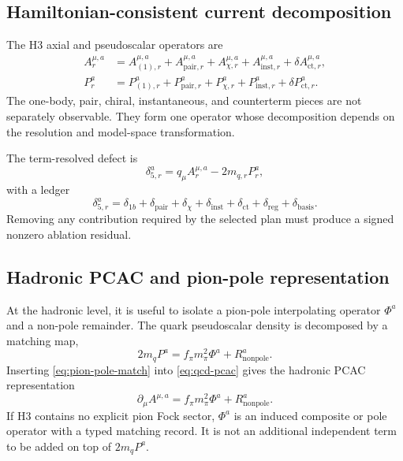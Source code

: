 \documentclass[11pt]{article}
\newcommand{\ct}{\mathrm{ct}}
\newcommand{\reg}{\mathrm{reg}}
\begin{document}
\subsection{Hamiltonian-consistent current decomposition}

The H3 axial and pseudoscalar operators are
\begin{align}
 A_{r}^{\mu,a}
 &={}
 A_{(1),r}^{\mu,a}
 +A_{\mathrm{pair},r}^{\mu,a}
 +A_{\chi,r}^{\mu,a}
 +A_{\mathrm{inst},r}^{\mu,a}
 +\delta A_{\ct,r}^{\mu,a},
 \\
 P_{r}^{a}
 &={}
 P_{(1),r}^{a}
 +P_{\mathrm{pair},r}^{a}
 +P_{\chi,r}^{a}
 +P_{\mathrm{inst},r}^{a}
 +\delta P_{\ct,r}^{a}.
 \label{eq:h3-axial-decomp}
\end{align}
The one-body, pair, chiral, instantaneous, and counterterm pieces are not
separately observable.  They form one operator whose decomposition depends on
the resolution and model-space transformation.

The term-resolved defect is
\begin{equation}
 \delta_{5,r}^{a}
 =
 q_{\mu}A_{r}^{\mu,a}
 -2m_{q,r}P_{r}^{a},
 \label{eq:axial-defect}
\end{equation}
with a ledger
\begin{equation}
 \delta_{5,r}^{a}
 =
 \delta_{1b}
 +\delta_{\mathrm{pair}}
 +\delta_{\chi}
 +\delta_{\mathrm{inst}}
 +\delta_{\ct}
 +\delta_{\reg}
 +\delta_{\mathrm{basis}}.
\end{equation}
Removing any contribution required by the selected plan must produce a signed
nonzero ablation residual.

\subsection{Hadronic PCAC and pion-pole representation}

At the hadronic level, it is useful to isolate a pion-pole interpolating
operator \(\Phi^a\) and a non-pole remainder.  The quark pseudoscalar density
is decomposed by a matching map,
\begin{equation}
 2m_q P^a
 =
 f_{\pi}m_{\pi}^{2}\Phi^a
 +R_{\mathrm{nonpole}}^a.
 \label{eq:pion-pole-match}
\end{equation}
Inserting \cref{eq:pion-pole-match} into \cref{eq:qcd-pcac} gives the
hadronic PCAC representation
\begin{equation}
 \partial_{\mu}A^{\mu,a}
 =
 f_{\pi}m_{\pi}^{2}\Phi^a
 +R_{\mathrm{nonpole}}^a.
 \label{eq:hadronic-pcac}
\end{equation}
If H3 contains no explicit pion Fock sector, \(\Phi^a\) is an induced
composite or pole operator with a typed matching record.  It is not an
additional independent term to be added on top of \(2m_qP^a\).
\end{document}
